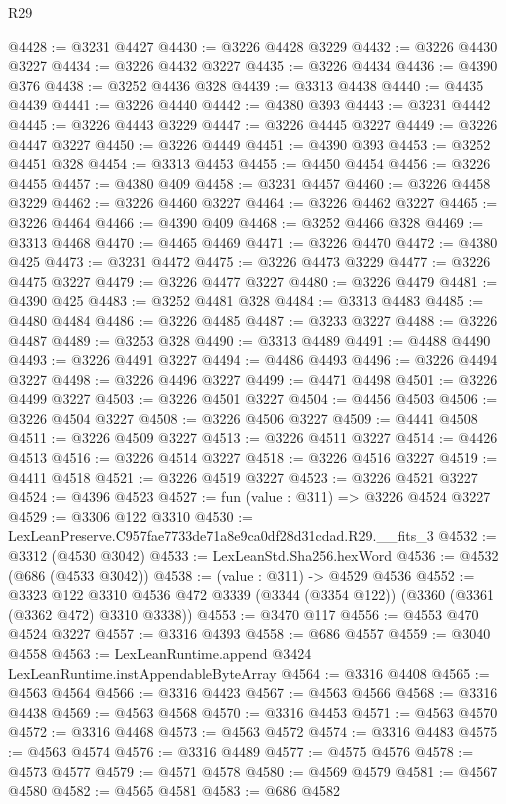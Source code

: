 \begin{lexlean}{R29}
\begin{coremodule}
@4428 := @3231 @4427
@4430 := @3226 @4428 @3229
@4432 := @3226 @4430 @3227
@4434 := @3226 @4432 @3227
@4435 := @3226 @4434
@4436 := @4390 @376
@4438 := @3252 @4436 @328
@4439 := @3313 @4438
@4440 := @4435 @4439
@4441 := @3226 @4440
@4442 := @4380 @393
@4443 := @3231 @4442
@4445 := @3226 @4443 @3229
@4447 := @3226 @4445 @3227
@4449 := @3226 @4447 @3227
@4450 := @3226 @4449
@4451 := @4390 @393
@4453 := @3252 @4451 @328
@4454 := @3313 @4453
@4455 := @4450 @4454
@4456 := @3226 @4455
@4457 := @4380 @409
@4458 := @3231 @4457
@4460 := @3226 @4458 @3229
@4462 := @3226 @4460 @3227
@4464 := @3226 @4462 @3227
@4465 := @3226 @4464
@4466 := @4390 @409
@4468 := @3252 @4466 @328
@4469 := @3313 @4468
@4470 := @4465 @4469
@4471 := @3226 @4470
@4472 := @4380 @425
@4473 := @3231 @4472
@4475 := @3226 @4473 @3229
@4477 := @3226 @4475 @3227
@4479 := @3226 @4477 @3227
@4480 := @3226 @4479
@4481 := @4390 @425
@4483 := @3252 @4481 @328
@4484 := @3313 @4483
@4485 := @4480 @4484
@4486 := @3226 @4485
@4487 := @3233 @3227
@4488 := @3226 @4487
@4489 := @3253 @328
@4490 := @3313 @4489
@4491 := @4488 @4490
@4493 := @3226 @4491 @3227
@4494 := @4486 @4493
@4496 := @3226 @4494 @3227
@4498 := @3226 @4496 @3227
@4499 := @4471 @4498
@4501 := @3226 @4499 @3227
@4503 := @3226 @4501 @3227
@4504 := @4456 @4503
@4506 := @3226 @4504 @3227
@4508 := @3226 @4506 @3227
@4509 := @4441 @4508
@4511 := @3226 @4509 @3227
@4513 := @3226 @4511 @3227
@4514 := @4426 @4513
@4516 := @3226 @4514 @3227
@4518 := @3226 @4516 @3227
@4519 := @4411 @4518
@4521 := @3226 @4519 @3227
@4523 := @3226 @4521 @3227
@4524 := @4396 @4523
@4527 := fun (value : @311) => @3226 @4524 @3227
@4529 := @3306 @122 @3310
@4530 := LexLeanPreserve.C957fae7733de71a8e9ca0df28d31cdad.R29.__fits_3
@4532 := @3312 (@4530 @3042)
@4533 := LexLeanStd.Sha256.hexWord
@4536 := @4532 (@686 (@4533 @3042))
@4538 := (value : @311) -> @4529 @4536
@4552 := @3323
    @122
    @3310
    @4536
    @472
    @3339
    (@3344 (@3354 @122))
    (@3360 (@3361 (@3362 @472) @3310 @3338))
@4553 := @3470 @117
@4556 := @4553 @470 @4524 @3227
@4557 := @3316 @4393
@4558 := @686 @4557
@4559 := @3040 @4558
@4563 := LexLeanRuntime.append @3424 LexLeanRuntime.instAppendableByteArray
@4564 := @3316 @4408
@4565 := @4563 @4564
@4566 := @3316 @4423
@4567 := @4563 @4566
@4568 := @3316 @4438
@4569 := @4563 @4568
@4570 := @3316 @4453
@4571 := @4563 @4570
@4572 := @3316 @4468
@4573 := @4563 @4572
@4574 := @3316 @4483
@4575 := @4563 @4574
@4576 := @3316 @4489
@4577 := @4575 @4576
@4578 := @4573 @4577
@4579 := @4571 @4578
@4580 := @4569 @4579
@4581 := @4567 @4580
@4582 := @4565 @4581
@4583 := @686 @4582

\end{coremodule}
\end{lexlean}
